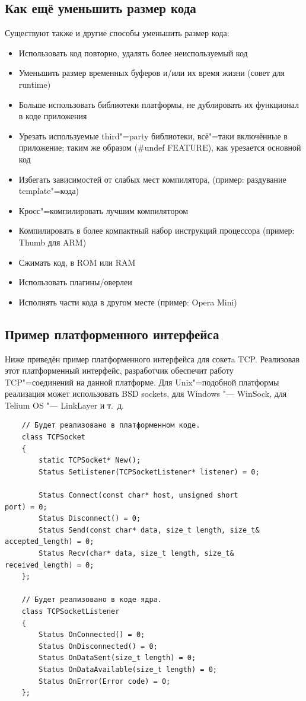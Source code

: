 \documentclass[10pt, a5paper]{article}
\begin{document}
\subsection*{Как ещё уменьшить размер кода}

Существуют также и другие способы уменьшить размер кода:

\begin{itemize}
  \item Использовать код повторно, удалять более неиспользуемый код
  \item Уменьшить размер временных буферов и/или их время жизни (совет для runtime)
  \item Больше использовать библиотеки платформы, не дублировать их функционал в коде приложения
  \item Урезать используемые third"=party библиотеки, всё"=таки включённые в приложение; таким же образом (\#undef FEATURE), как урезается основной код
  \item Избегать зависимостей от слабых мест компилятора, (пример: раздувание template"=кода)
  \item Кросс"=компилировать лучшим компилятором
  \item Компилировать в более компактный набор инструкций процессора (пример: Thumb для ARM)
  \item Сжимать код, в ROM или RAM
  \item Использовать плагины/оверлеи
  \item Исполнять части кода в другом месте (пример: Opera Mini)
\end{itemize}

\subsection*{Пример платформенного интерфейса}

Ниже приведён пример платформенного интерфейса для сокетa TCP. Реализовав этот платформенный интерфейс, разработчик \linebreak обеспечит работу TCP"=соединений на данной платформе. Для Unix"=подобной платформы реализация может использовать BSD sockets, для Windows "--- WinSock, для Telium OS "--- LinkLayer и т.~д.

\begin{verbatim}
    // Будет реализовано в платформенном коде.
    class TCPSocket
    {
        static TCPSocket* New();
        Status SetListener(TCPSocketListener* listener) = 0;

        Status Connect(const char* host, unsigned short 
port) = 0;
        Status Disconnect() = 0;
        Status Send(const char* data, size_t length, size_t& 
accepted_length) = 0;
        Status Recv(char* data, size_t length, size_t& 
received_length) = 0;
    };

    // Будет реализовано в коде ядра.
    class TCPSocketListener
    {
        Status OnConnected() = 0;
        Status OnDisconnected() = 0;
        Status OnDataSent(size_t length) = 0;
        Status OnDataAvailable(size_t length) = 0;
        Status OnError(Error code) = 0;
    };
\end{verbatim}
\end{document}

